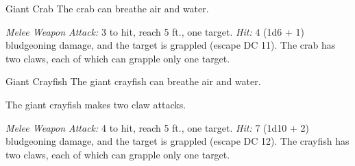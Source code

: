 \documentclass[10pt,a4paper,twoside,bg=print,twocolumn,openany,nodeprecatedcode]{dndbook}
\begin{document}
\clearpage

\begin{DndMonster}[float=t]{Giant Crab}
\DndMonsterBasics[
armor-class = {15 (natural armor)},
hit-points = {\DndDice{3d8}},
speed = {30 ft., swim 30 ft.}
]
\DndMonsterAbilityScores[
 str = 13,
 dex = 15,
 con = 11,
 int = 1,
 wis = 9,
 cha = 3
]
\DndMonsterDetails[
skills = {Stealth +4},
senses = {blindsight 30 ft., passive perception 9},
challenge = 1/8,
]
The crab can breathe air and water.

\textsl{Melee Weapon Attack:} 3 to hit, reach 5 ft., one target. \textsl{Hit:} 4 (1d6 + 1) bludgeoning damage, and the target is grappled (escape DC 11). The crab has two claws, each of which can grapple only one target.

\end{DndMonster}



\begin{DndMonster}[float=t]{Giant Crayfish}
\DndMonsterBasics[
armor-class = {15 (natural armor)},
hit-points = {\DndDice{7d10 + 7}},
speed = {30 ft., swim 30 ft.}
]
\DndMonsterAbilityScores[
 str = 15,
 dex = 13,
 con = 13,
 int = 1,
 wis = 9,
 cha = 3
]
\DndMonsterDetails[
skills = {Stealth +3},
senses = {blindsight 30 ft., passive perception 9},
challenge = 2,
]
The giant crayfish can breathe air and water.

The giant crayfish makes two claw attacks.

\textsl{Melee Weapon Attack:} 4 to hit, reach 5 ft., one target. \textsl{Hit:} 7 (1d10 + 2) bludgeoning damage, and the target is grappled (escape DC 12). The crayfish has two claws, each of which can grapple only one target.

\end{DndMonster}
\end{document}
